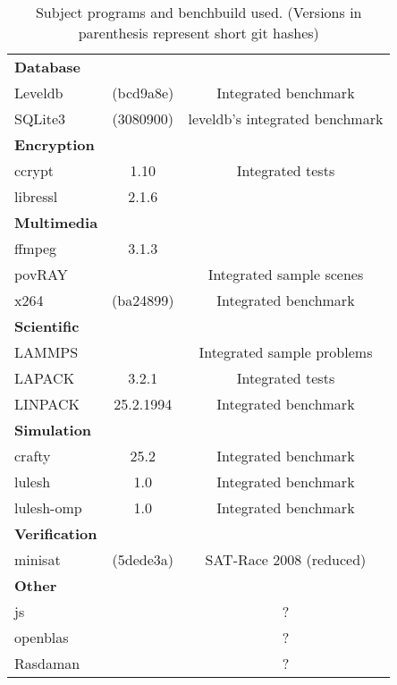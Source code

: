 \begin{table}[H]
{\begin{minipage}{\textwidth}
\begin{tabularx}{\textwidth}{lcC}
                \midrule
                \textbf{Database}\\
                Leveldb & (bcd9a8e) & Integrated benchmark\\
                SQLite3 & (3080900) & leveldb's integrated benchmark\\
                \midrule
                \textbf{Encryption}\\
                ccrypt & 1.10 & Integrated tests\\
                libressl & 2.1.6\\
                \midrule
                \textbf{Multimedia}\\
                ffmpeg & 3.1.3\\
                povRAY &  & Integrated sample scenes\\
                x264 & (ba24899) & Integrated benchmark\\
                \midrule
                \textbf{Scientific}\\
                LAMMPS &  & Integrated sample problems\\
                LAPACK & 3.2.1 & Integrated tests\\
                LINPACK & 25.2.1994 & Integrated benchmark\\
                \midrule
                \textbf{Simulation}\\
                crafty & 25.2 & Integrated benchmark\\
                lulesh & 1.0 & Integrated benchmark\\
                lulesh-omp & 1.0 & Integrated benchmark\\
                \midrule
                \textbf{Verification}\\
                minisat & (5dede3a) & SAT-Race 2008 (reduced)\\
                \midrule
                \textbf{Other}\\
                js &  & ?\\
                openblas &  & ?\\
                Rasdaman &  & ?\\
                \bottomrule
            \end{tabularx}
            \caption[Subject programs]{Subject programs and benchbuild used. (Versions in parenthesis represent short git hashes)}
            \label{tab:subjectPrograms}
        \end{minipage}
    }
\end{table}

